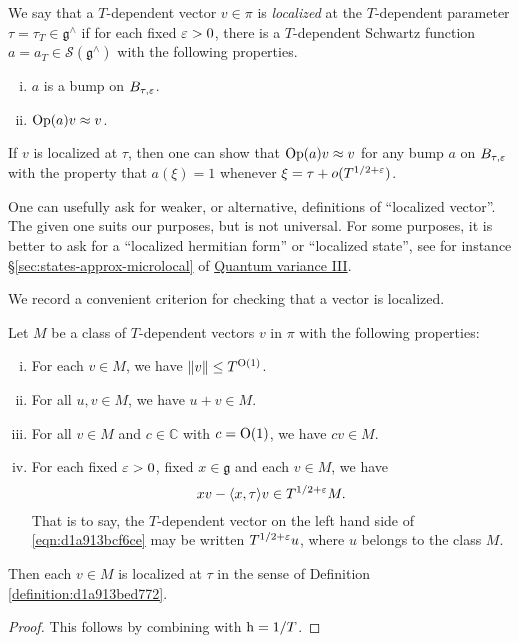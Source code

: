 \documentclass[reqno]{amsart} 
\numberwithin{equation}{section}
\begin{document}
\begin{definition}\label{definition:d1a913bed772}
  We say that a $T$-dependent vector $v \in \pi$ is \emph{localized} at the $T$-dependent parameter $\tau = \tau_T \in \mathfrak{g}^\wedge$ if for each fixed $\varepsilon > 0$, there is a $T$-dependent Schwartz function $a = a_T \in \mathcal{S} (\mathfrak{g}^\wedge)$ with the following properties.
  \begin{enumerate}[(i)]
  \item $a$ is a bump on $B_{\tau,\varepsilon}$.
  \item $\operatorname{Op}(a) v \approx v$.
  \end{enumerate}
\end{definition}
\begin{remark}
  If $v$ is localized at $\tau$, then one can show that $\operatorname{Op}(a) v \approx v$ for any bump $a$ on $B_{\tau,\varepsilon}$ with the property that $a(\xi) = 1$ whenever $\xi = \tau + o(T^{1/2+\varepsilon})$.
\end{remark}
\begin{remark}
One can usefully ask for weaker, or alternative, definitions of ``localized vector''.  The given one suits our purposes, but is not universal.  For some purposes, it is better to ask for a ``localized hermitian form'' or ``localized state'', see for instance \S\ref{sec:states-approx-microlocal} of \href{var-quat-3-submitted.pdf}{Quantum variance III}.
\end{remark}

We record a convenient criterion for checking that a vector is localized.
\begin{theorem}\label{theorem:d1a913c8091b}
  Let $M$ be a class of $T$-dependent vectors $v$ in $\pi$ with the following properties:
  \begin{enumerate}[(i)]
  \item For each $v \in M$, we have $\lVert v \rVert \leq T^{\operatorname{O}(1)}$.
  \item For all $u, v \in M$, we have $u + v \in M$.
  \item For all $v \in M$ and $c \in \mathbb{C}$ with $c = \operatorname{O}(1)$, we have $c v \in M$.
  \item For each fixed $\varepsilon > 0$, fixed $x \in \mathfrak{g}$ and each $v \in M$, we have
    \begin{equation}\label{eqn:d1a913bcf6ce}
      x v - \langle x, \tau  \rangle v \in T^{1/2+\varepsilon} M.
    \end{equation}
    That is to say, the $T$-dependent vector on the left hand side of \eqref{eqn:d1a913bcf6ce} may be written $T^{1/2+\varepsilon} u$, where $u$ belongs to the class $M$.
  \end{enumerate}
  Then each $v \in M$ is localized at $\tau$ in the sense of Definition \ref{definition:d1a913bed772}.
\end{theorem}
\begin{proof}
  This follows by combining \cite[Lem 14.5, Thm 14.12]{2021arXiv210915230N} with $\operatorname{h} = 1/T$.
\end{proof}
\end{document}
